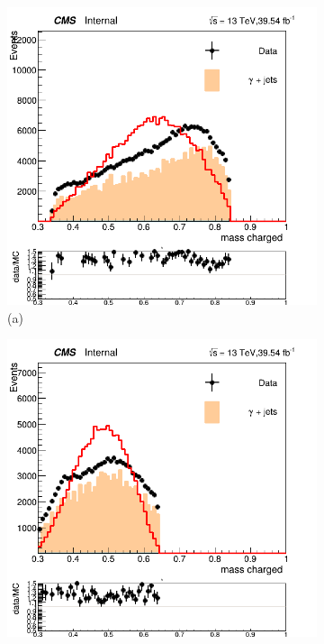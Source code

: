 \begin{figure}[!ht]
    \captionsetup[subfigure]{labelformat=empty}
    \vspace*{-0.2cm}
    \centering
    \setlength{\mylength}{\textwidth}
    \begin{subfigure}[t]{0.50\mylength}
        \centering
        \includegraphics[width=0.45\mylength]{resources/plots/Phi3_dtrk_mass.png}
        \caption{\footnotesize (a)}
    \end{subfigure}%
    \begin{subfigure}[t]{0.50\mylength}
        \centering
        \includegraphics[width=0.45\mylength]{resources/plots/Omega_dtrk_mass.png}

\end{subfigure}
\end{figure}
